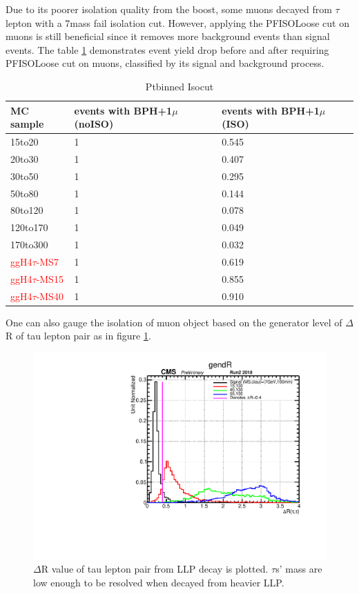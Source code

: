 Due to its poorer isolation quality from the boost, some muons decayed from $\tau$ lepton with a 7\GeV mass fail isolation cut.
However, applying the PFISOLoose cut on muons is still beneficial since it removes more background events than signal events.
The table \ref{tab:ISOeff} demonstrates event yield drop before and after requiring PFISOLoose cut on muons, classified by its signal and background process.


\begin{tiny}
    \begin{table}
    \caption{Ptbinned Isocut}
  \centering
\begin{tabular}{|p{3cm}|p{2cm}|p{2cm}|}
\hline
MC sample & events with BPH+1$\mu$ (noISO) & events with BPH+1$\mu$ (ISO) \\
\hline
 15to20 & 1 & 0.545 \\
 \hline
 20to30 & 1 & 0.407 \\
\hline
 30to50 & 1 & 0.295 \\
\hline
 50to80 & 1 & 0.144 \\
\hline
 80to120 & 1 & 0.078 \\
\hline
120to170 & 1 & 0.049 \\
\hline
170to300 & 1 & 0.032 \\
\hline
\textcolor{red}{ggH4$\tau$-MS7}& 1 & 0.619 \\
\hline
\textcolor{red}{ggH4$\tau$-MS15} & 1 & 0.855 \\
\hline
\textcolor{red}{ggH4$\tau$-MS40} & 1 & 0.910 \\
 \hline
    \end{tabular}
\label{tab:ISOeff}
    \end{table}
\end{tiny}    

One can also gauge the isolation of muon object based on the generator level of $\Delta$R of tau lepton pair as in figure \ref{fig:taudeltaR}.
 \begin{figure}[h!]
   \label{fig:taudeltaR}
   \centering
   \includegraphics[width=0.60\linewidth]{figs/taugendR.pdf}
   \caption{$\Delta$R value of tau lepton pair from LLP decay is plotted. $\tau$s' mass are low enough to be resolved when decayed from heavier LLP.}
 \end{figure}





